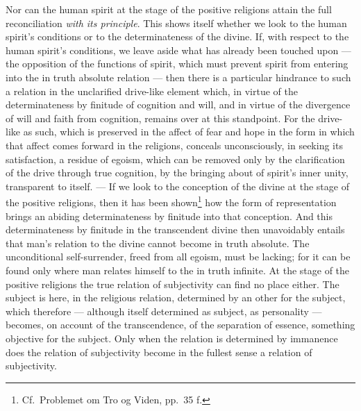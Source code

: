 \documentclass[12pt,a4paper]{book}
\begin{document}
Nor can the human spirit at the stage of the positive religions attain the
full reconciliation \emph{with its principle}. This shows itself whether we
look to the human spirit's
\setcounter{footnote}{0}%
conditions or to the determinateness of the divine. If, with respect to the
human spirit's conditions, we leave aside what has already been touched upon
--- the opposition of the functions of spirit, which must prevent spirit from
entering into the in truth absolute relation --- then there is a particular
hindrance to such a relation in the unclarified drive-like element which, in
virtue of the determinateness by finitude of cognition and will, and in virtue
of the divergence of will and faith from cognition, remains over at this
standpoint. For the drive-like as such, which is preserved in the affect of
fear and hope in the form in which that affect comes forward in the religions,
conceals unconsciously, in seeking its satisfaction, a residue of egoism,
which can be removed only by the clarification of the drive through true
cognition, by the bringing about of spirit's inner unity, transparent to
itself. --- If we look to the conception of the divine at the stage of the
positive religions, then it has been shown\footnote{Cf.\ Problemet om Tro og
Viden, pp.\ 35 f.} how the form of representation brings an abiding
determinateness by finitude into that conception. And this determinateness by
finitude in the transcendent divine then unavoidably entails that man's
relation to the divine cannot become in truth absolute. The unconditional
self-surrender, freed from all egoism, must be lacking; for it can be found
only where man relates himself to the in truth infinite. At the stage of the
positive religions the true relation of subjectivity can find no place either.
The subject is here, in the religious relation, determined by an other for the
subject, which therefore --- although itself determined as subject, as
personality --- becomes, on account of the transcendence, of the separation of
essence, something objective for the subject. Only when the relation is
determined by immanence does the relation of subjectivity become in the
fullest sense a relation of subjectivity.
\end{document}
